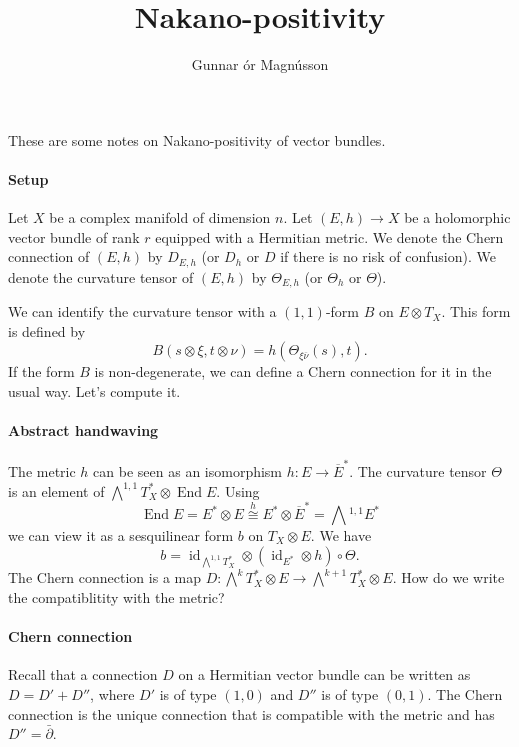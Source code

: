 \documentclass{article}
\DeclareMathOperator{\id}{id}
\DeclareMathOperator{\End}{End}
\begin{document}
\title{Nakano-positivity}
\author{Gunnar \TH\'or Magn\'usson}

\maketitle

These are some notes on Nakano-positivity of vector bundles.


\paragraph{Setup}

Let $X$ be a complex manifold of dimension $n$.
Let $(E, h) \to X$ be a holomorphic vector bundle of rank $r$ equipped with a Hermitian metric.
We denote the Chern connection of $(E,h)$ by $D_{E,h}$ (or $D_h$ or $D$ if there is no risk of confusion).
We denote the curvature tensor of $(E,h)$ by $\Theta_{E,h}$ (or $\Theta_h$ or $\Theta$).

We can identify the curvature tensor with a $(1,1)$-form $B$ on $E \otimes T_X$. This form is defined by
$$
B(s \otimes \xi, t \otimes \nu)
= h(\Theta_{\xi \overline{\nu}}(s), t).
$$
If the form $B$ is non-degenerate, we can define a Chern connection for it in the usual way. Let's compute it.


\paragraph{Abstract handwaving}

The metric $h$ can be seen as an isomorphism $h : E \to \overline E^*$. The curvature tensor $\Theta$ is an element of $\bigwedge^{1,1} T_X^* \otimes \End E$. Using
$$
\End E
= E^* \otimes E
\overset{h}{\cong} E^* \otimes \overline{E}^*
= \bigwedge{}^{\!\! 1,1} E^*
$$
we can view it as a sesquilinear form $b$ on $T_X \otimes E$. We have
$$
b = \id_{\bigwedge^{1,1}T_X^*} \otimes (\id_{E^*} \otimes h) \circ \Theta.
$$
The Chern connection is a map $D : \bigwedge^k T_X^* \otimes E \to \bigwedge^{k+1} T_X^* \otimes E$. How do we write the compatiblitity with the metric?

\paragraph{Chern connection}

Recall that a connection $D$ on a Hermitian vector bundle can be written as $D = D' + D''$, where $D'$ is of type $(1,0)$ and $D''$ is of type $(0,1)$. The Chern connection is the unique connection that is compatible with the metric and has $D'' = \bar\partial$.
\end{document}

